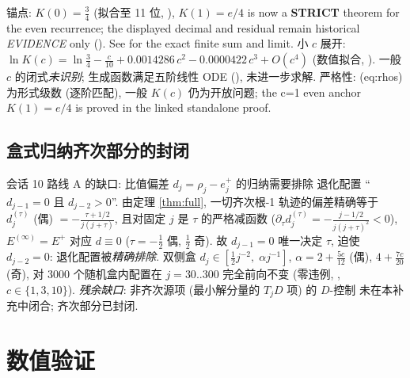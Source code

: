 \documentclass[UTF8]{ctexart}
\begin{document}
锚点: $K(0) = \tfrac34$ (拟合至 11 位, ),
$K(1) = e/4$ is now a \textbf{STRICT} theorem for the even recurrence;
the displayed decimal and residual remain historical \emph{EVIDENCE} only
(). See
 for the exact finite sum and limit.
小 $c$ 展开: $\ln K(c) = \ln\tfrac34 - \tfrac{c}{10}
+ 0.0014286\,c^2 - 0.0000422\,c^3 + O(c^4)$
(数值拟合, ). 一般 $c$ 的闭式\emph{未识别};
生成函数满足五阶线性 ODE (), 未进一步求解.
严格性: (eq:rhos) 为形式级数 (逐阶匹配), 一般 $K(c)$ 仍为开放问题;
the c=1 even anchor $K(1)=e/4$ is proved in the linked standalone proof.

\subsection{盒式归纳齐次部分的封闭}\label{sec:box}

会话 10 路线 A 的缺口: 比值偏差 $d_j = \rho_j - e^+_j$ 的归纳需要排除
退化配置 ``$d_{j-1} = 0$ 且 $d_{j-2} > 0$''. 由定理 \ref{thm:full},
一切齐次根-1 轨迹的偏差精确等于 $d^{(\tau)}_j$ (偶)
$= -\frac{\tau+1/2}{j(j+\tau)}$, 且对固定 $j$ 是 $\tau$ 的严格减函数
($\partial_\tau d^{(\tau)}_j = -\frac{j-1/2}{j(j+\tau)^2} < 0$),
$E^{(\infty)} = E^+$ 对应 $d \equiv 0$ ($\tau = -\tfrac12$ 偶,
$\tfrac12$ 奇). 故 $d_{j-1} = 0$ 唯一决定 $\tau$, 迫使
$d_{j-2} = 0$: 退化配置被\emph{精确排除}. 双侧盒
$d_j \in [\tfrac12 j^{-2},\; \alpha j^{-1}]$,
$\alpha = 2 + \tfrac{5c}{12}$ (偶), $4 + \tfrac{7c}{20}$ (奇),
对 3000 个随机盒内配置在 $j = 30..300$ 完全前向不变 (零违例,
, $c \in \{1,3,10\}$).
\emph{残余缺口}: 非齐次源项 (最小解分量的 $T_j D$ 项) 的 $D$-控制
未在本补充中闭合; 齐次部分已封闭.

\section{数值验证}
\end{document}
